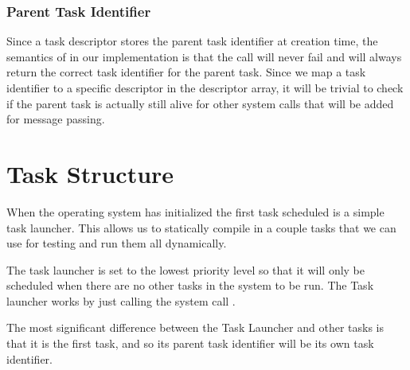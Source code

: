 \documentclass[pdftex,10pt,a4paper]{article}
\begin{document}
\subsubsection*{Parent Task Identifier}

Since a task descriptor stores the parent task identifier at creation
time, the semantics of  in our implementation is
that the call will never fail and will always return the correct task
identifier for the parent task. Since we map a task identifier to a
specific descriptor in the descriptor array, it will be trivial to
check if the parent task is actually still alive for other system
calls that will be added for message passing.


\section*{Task Structure}

When the operating system has initialized the first task scheduled is
a simple task launcher. This allows us to statically compile in a
couple tasks that we can use for testing and run them all
dynamically.

The task launcher is set to the lowest priority level so that it will
only be scheduled when there are no other tasks in the system to be
run. The Task launcher works by just calling the system call
.

The most significant difference between the Task Launcher and other
tasks is that it is the first task, and so its parent task identifier
will be its own task identifier.
\end{document}
